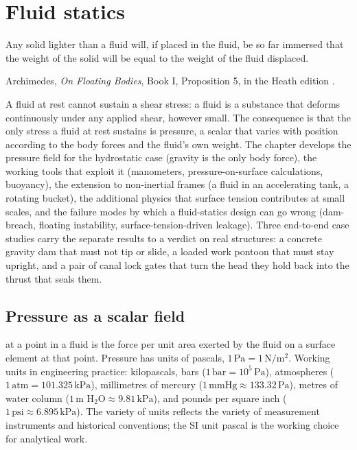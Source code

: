 \chapter{Fluid statics}
\label{vol03:ch10}

\epigraph{Any solid lighter than a fluid will, if placed in the
fluid, be so far immersed that the weight of the solid will be
equal to the weight of the fluid displaced.}{Archimedes,
\emph{On Floating Bodies}, Book I, Proposition 5, in the Heath
edition \cite[Book I, Prop.~5]{hist:archimedes-floating}.}


\noindent
A fluid at rest cannot sustain a shear stress: a fluid is a
substance that deforms continuously under any applied shear,
however small. The consequence is that the only stress a fluid at
rest sustains is pressure, a scalar that varies with position
according to the body forces and the fluid's own weight. The
chapter develops the pressure field for the hydrostatic case
(gravity is the only body force), the working tools that exploit
it (manometers, pressure-on-surface calculations, buoyancy), the
extension to non-inertial frames (a fluid in an accelerating
tank, a rotating bucket), the additional physics that surface
tension contributes at small scales, and the failure modes by
which a fluid-statics design can go wrong (dam-breach, floating
instability, surface-tension-driven leakage). Three end-to-end
case studies carry the separate results to a verdict on real
structures: a concrete gravity dam that must not tip or slide, a
loaded work pontoon that must stay upright, and a pair of canal
lock gates that turn the head they hold back into the thrust that
seals them.

\section{Pressure as a scalar field}

 at a point in a fluid is the force per unit
area exerted by the fluid on a surface element at that point.
Pressure has units of pascals, $1\,\text{Pa} = 1\,\text{N}/\text{m}
^2$. Working units in engineering practice: kilopascals, bars
($1\,\text{bar} = 10^5\,\text{Pa}$), atmospheres ($1\,\text{atm}
= 101.325\,\text{kPa}$), millimetres of mercury ($1\,\text{mmHg}
\approx 133.32\,\text{Pa}$), metres of water column ($1\,\text{m
H}_2\text{O} \approx 9.81\,\text{kPa}$), and pounds per square
inch ($1\,\text{psi} \approx 6.895\,\text{kPa}$). The variety of
units reflects the variety of measurement instruments and
historical conventions; the SI unit pascal is the working choice
for analytical work.

